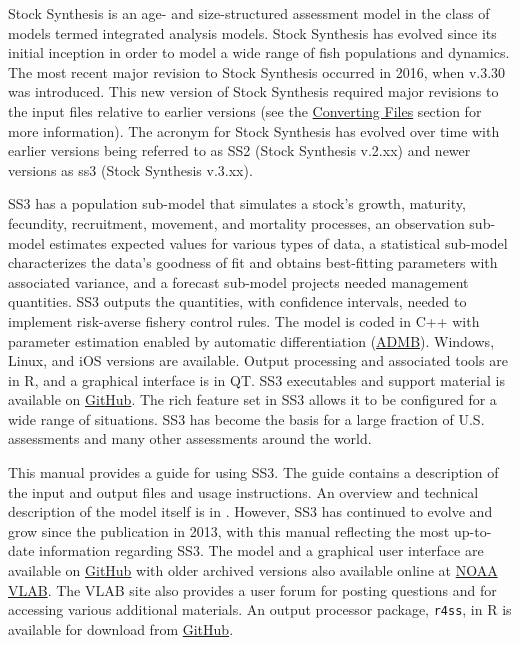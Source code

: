Stock Synthesis is an age- and size-structured assessment model in the class of models termed integrated analysis models. Stock Synthesis has evolved since its initial inception in order to model a wide range of fish populations and dynamics. The most recent major revision to Stock Synthesis occurred in 2016, when v.3.30 was introduced. This new version of Stock Synthesis required major revisions to the input files relative to earlier versions (see the \hyperlink{ConvIssues}{Converting Files} section for more information). The acronym for Stock Synthesis has evolved over time with earlier versions being referred to as SS2 (Stock Synthesis v.2.xx) and newer versions as \gls{ss3} (Stock Synthesis v.3.xx). 

SS3 has a population sub-model that simulates a stock's growth, maturity, fecundity, recruitment, movement, and mortality processes, an observation sub-model estimates expected values for various types of data, a statistical sub-model characterizes the data's goodness of fit and obtains best-fitting parameters with associated variance, and a forecast sub-model projects needed management quantities. SS3 outputs the quantities, with confidence intervals, needed to implement risk-averse fishery control rules. The model is coded in C++ with parameter estimation enabled by automatic differentiation (\href{http://www.admb-project.org}{ADMB}). Windows, Linux, and iOS versions are available.  Output processing and associated tools are in R, and a graphical interface is in QT. SS3 executables and support material is available on \href{https://github.com/nmfs-ost}{GitHub}. The rich feature set in SS3 allows it to be configured for a wide range of situations. SS3 has become the basis for a large fraction of U.S. assessments and many other assessments around the world.  

This manual provides a guide for using SS3. The guide contains a description of the input and output files and usage instructions. An overview and technical description of the model itself is in \citet{methotstock2013}. However, SS3 has continued to evolve and grow since the publication in 2013, with this manual reflecting the most up-to-date information regarding SS3. The model and a graphical user interface are available on \href{https://github.com/nmfs-ost}{GitHub} with older archived versions also available online at \href{https://vlab.noaa.gov/web/stock-synthesis}{NOAA VLAB}. The VLAB site also provides a user forum for posting questions and for accessing various additional materials. An output processor package, \texttt{r4ss}, in R is available for download from \href{https://github.com/r4ss/r4ss}{GitHub}.


